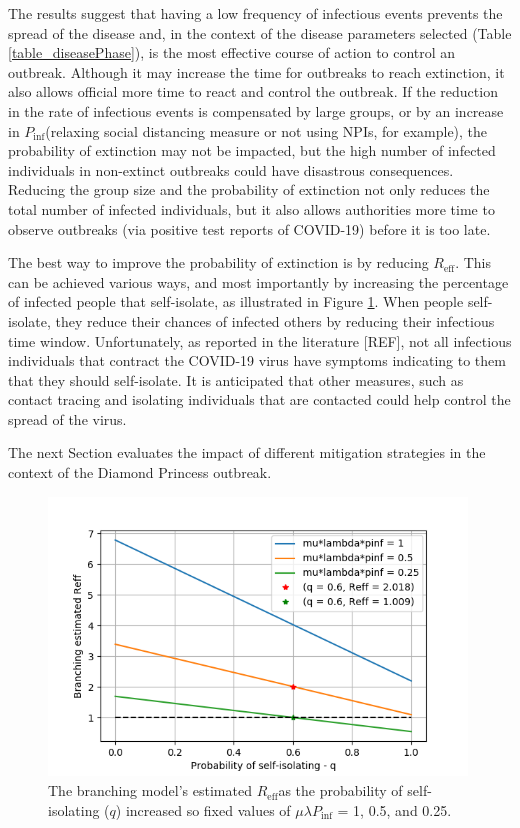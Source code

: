 \documentclass[sr]{drdc-report}
\def\Reff{\ensuremath{R_\mathrm{eff}}}
\def\Pinf{\ensuremath{P_\mathrm{inf}}}
\begin{document}
The results suggest that having a low frequency of infectious events prevents the spread of the disease and, in the context of the disease parameters selected (Table \ref{table_diseasePhase}), is the most effective course of action to control an outbreak. Although it may increase the time for outbreaks to reach extinction, it also allows official more time to react and control the outbreak. If the reduction in the rate of infectious events is compensated by large groups, or by an increase in \Pinf (relaxing social distancing measure or not using NPIs, for example), the probability of extinction may not be impacted, but the high number of infected individuals in non-extinct outbreaks could have disastrous consequences. Reducing the group size and the probability of extinction not only reduces the total number of infected individuals, but it also allows authorities more time to observe outbreaks (via positive test reports of COVID-19) before it is too late.  

The best way to improve the probability of extinction is by reducing \Reff. This can be achieved various ways, and most importantly by increasing the percentage of infected people that self-isolate, as illustrated in Figure \ref{fig_plt_brReffvsq}. When people self-isolate, they reduce their chances of infected others by reducing their infectious time window. Unfortunately, as reported in the literature [REF], not all infectious individuals that contract the COVID-19 virus have symptoms indicating to them that they should self-isolate. It is anticipated that other measures, such as contact tracing and isolating individuals that are contacted could help control the spread of the virus. 

The next Section evaluates the impact of different mitigation strategies in the context of the Diamond Princess outbreak. 

\begin{figure}
  \includegraphics[width=0.99\textwidth, keepaspectratio=true]{figures/plt_brReffvsq}
  \caption{The branching model's estimated \Reff as the probability of self-isolating ($q$) increased so fixed values of $\mu\lambda\Pinf$ = 1, 0.5, and 0.25.}\label{fig_plt_brReffvsq}
\end{figure}
\end{document}
